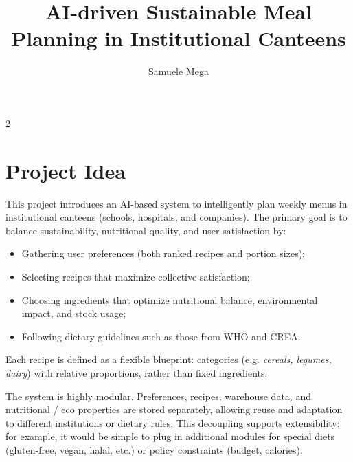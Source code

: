 \documentclass[10pt,a4paper]{article}
\title{AI-driven Sustainable Meal Planning in Institutional Canteens}
\author{Samuele Mega}
\date{}
\begin{document}
\maketitle

\begin{multicols}{2}

\section{Project Idea}

This project introduces an AI-based system to intelligently plan weekly menus in institutional canteens (schools, hospitals, and companies). The primary goal is to balance sustainability, nutritional quality, and user satisfaction by:

\begin{itemize}[leftmargin=*]
  \item Gathering user preferences (both ranked recipes and portion sizes);
  \item Selecting recipes that maximize collective satisfaction;
  \item Choosing ingredients that optimize nutritional balance, environmental impact, and stock usage;
  \item Following dietary guidelines such as those from WHO and CREA.
\end{itemize}

Each recipe is defined as a flexible blueprint: categories (e.g. \emph{cereals, legumes, dairy}) with relative proportions, rather than fixed ingredients.

The system is highly modular. Preferences, recipes, warehouse data, and nutritional / eco properties are stored separately, allowing reuse and adaptation to different institutions or dietary rules. This decoupling supports extensibility: for example, it would be simple to plug in additional modules for special diets (gluten-free, vegan, halal, etc.) or policy constraints (budget, calories).


\end{multicols}
\end{document}
